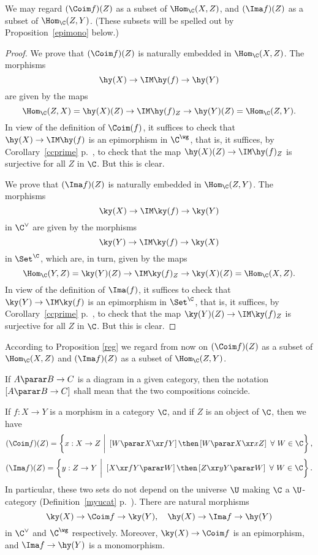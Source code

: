 \documentclass[12pt]{article}
\theoremstyle{remark}
\theoremstyle{definition}
\begin{document}
\begin{prop}
We may regard $(\Coim f)(Z)$ as a subset of $\Hom_\C(X,Z)$, and $(\Ima f)(Z)$ as a subset of $\Hom_\C(Z,Y)$. (These subsets will be spelled out by Proposition~\ref{epimono} below.)
\end{prop}

\begin{proof}
We prove that $(\Coim f)(Z)$ is naturally embedded in $\Hom_\C(X,Z)$. The morphisms 
$$
\hy(X)\to\IM \hy(f)\to\hy(Y)
$$ 
are given by the maps 
$$
\Hom_\C(Z,X)=\hy(X)(Z)\to\IM\hy(f)_Z\to\hy(Y)(Z)=\Hom_\C(Z,Y).
$$ 
In view of the definition of $\Coim(f)$, it suffices to check that $\hy(X)\to\IM\hy(f)$ is an epimorphism in $\C^\wg$, that is, it suffices, by Corollary~\ref{ccprime} p.~, to check that the map $\hy(X)(Z)\to\IM\hy(f)_Z$ is surjective for all $Z$ in $\C$. But this is clear. 

We prove that $(\Ima f)(Z)$ is naturally embedded in $\Hom_\C(Z,Y)$. The morphisms 
$$
\ky(X)\to\IM\ky(f)\to\ky(Y)
$$ 
in $\C^\vee$ are given by the morphisms 
$$
\ky(Y)\to\IM\ky(f)\to\ky(X)
$$ 
in $\Set^\C$, which are, in turn, given by the maps 
$$
\Hom_\C(Y,Z)=\ky(Y)(Z)\to\IM\ky(f)_Z\to\ky(X)(Z)=\Hom_\C(X,Z).
$$ 
In view of the definition of $\Ima(f)$, it suffices to check that $\ky(Y)\to\IM\ky(f)$ is an epimorphism in $\Set^\C$, that is, it suffices, by Corollary~\ref{ccprime} p.~, to check that the map $\ky(Y)(Z)\to\IM\ky(f)_Z$ is surjective for all $Z$ in $\C$. But this is clear. 
\end{proof} 

According to Proposition \ref{reg} we regard from now on $(\Coim f)(Z)$ as a subset of $\Hom_\C(X,Z)$ and $(\Ima f)(Z)$ as a subset of $\Hom_\C(Z,Y)$.\bigskip

\begin{conv}
If $A\parar B\to C$ is a diagram in a given category, then the notation $[A\parar B\to C]$ shall mean that the two compositions coincide.
\end{conv}\bigskip

\begin{prop}
If $f:X\to Y$ is a morphism in a category $\C$, and if $Z$ is an object of $\C$, then we have 
$$
(\Coim f)(Z)=\left\{x:X\to Z\ \bigg|\ \left[W\parar X\xr fY\right]\then\left[W\parar X\xr xZ\right]\ \forall\ W\in\C\right\},
$$
$$
(\Ima f)(Z)=\left\{y:Z\to Y\ \bigg|\ \left[X\xr fY\parar W\right]\then\left[Z\xr yY\parar W\right]\ \forall\ W\in\C\right\}.
$$ 
In particular, these two sets do not depend on the universe $\U$ making $\C$ a $\U$\--category (Definition~\ref{myucat} p.~). There are natural morphisms 
$$
\ky(X)\to\Coim f\to\ky(Y),\quad\hy(X)\to\Ima f\to\hy(Y)
$$ 
in $\C^\vee$ and $\C^\wg$ respectively. Moreover, $\ky(X)\to\Coim f$ is an epimorphism, and $\Ima f\to\hy(Y)$ is a monomorphism. 
\end{prop} 
\end{document}
